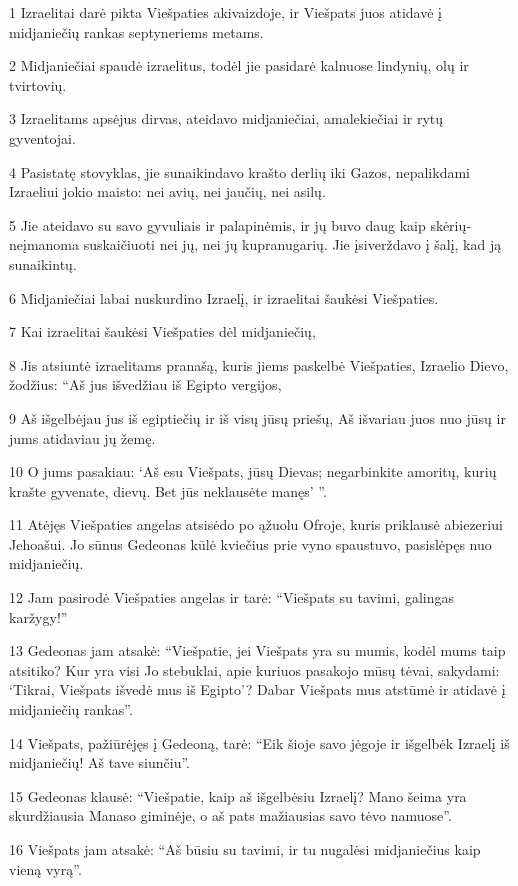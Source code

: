 \par 1 Izraelitai darė pikta Viešpaties akivaizdoje, ir Viešpats juos atidavė į midjaniečių rankas septyneriems metams. 
\par 2 Midjaniečiai spaudė izraelitus, todėl jie pasidarė kalnuose lindynių, olų ir tvirtovių. 
\par 3 Izraelitams apsėjus dirvas, ateidavo midjaniečiai, amalekiečiai ir rytų gyventojai. 
\par 4 Pasistatę stovyklas, jie sunaikindavo krašto derlių iki Gazos, nepalikdami Izraeliui jokio maisto: nei avių, nei jaučių, nei asilų. 
\par 5 Jie ateidavo su savo gyvuliais ir palapinėmis, ir jų buvo daug kaip skėrių­neįmanoma suskaičiuoti nei jų, nei jų kupranugarių. Jie įsiverždavo į šalį, kad ją sunaikintų. 
\par 6 Midjaniečiai labai nuskurdino Izraelį, ir izraelitai šaukėsi Viešpaties. 
\par 7 Kai izraelitai šaukėsi Viešpaties dėl midjaniečių, 
\par 8 Jis atsiuntė izraelitams pranašą, kuris jiems paskelbė Viešpaties, Izraelio Dievo, žodžius: “Aš jus išvedžiau iš Egipto vergijos, 
\par 9 Aš išgelbėjau jus iš egiptiečių ir iš visų jūsų priešų, Aš išvariau juos nuo jūsų ir jums atidaviau jų žemę. 
\par 10 O jums pasakiau: ‘Aš esu Viešpats, jūsų Dievas; negarbinkite amoritų, kurių krašte gyvenate, dievų. Bet jūs neklausėte manęs’ ”. 
\par 11 Atėjęs Viešpaties angelas atsisėdo po ąžuolu Ofroje, kuris priklausė abiezeriui Jehoašui. Jo sūnus Gedeonas kūlė kviečius prie vyno spaustuvo, pasislėpęs nuo midjaniečių. 
\par 12 Jam pasirodė Viešpaties angelas ir tarė: “Viešpats su tavimi, galingas karžygy!” 
\par 13 Gedeonas jam atsakė: “Viešpatie, jei Viešpats yra su mumis, kodėl mums taip atsitiko? Kur yra visi Jo stebuklai, apie kuriuos pasakojo mūsų tėvai, sakydami: ‘Tikrai, Viešpats išvedė mus iš Egipto’? Dabar Viešpats mus atstūmė ir atidavė į midjaniečių rankas”. 
\par 14 Viešpats, pažiūrėjęs į Gedeoną, tarė: “Eik šioje savo jėgoje ir išgelbėk Izraelį iš midjaniečių! Aš tave siunčiu”. 
\par 15 Gedeonas klausė: “Viešpatie, kaip aš išgelbėsiu Izraelį? Mano šeima yra skurdžiausia Manaso giminėje, o aš pats mažiausias savo tėvo namuose”. 
\par 16 Viešpats jam atsakė: “Aš būsiu su tavimi, ir tu nugalėsi midjaniečius kaip vieną vyrą”. 
